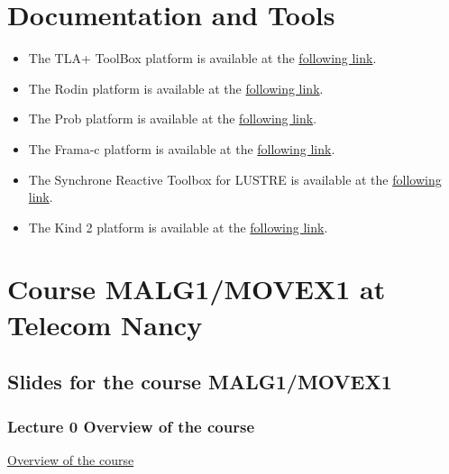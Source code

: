 \documentclass[ 12pt]{article}
\begin{document}
\tableofcontents


\section{Documentation and Tools}

\begin{itemize}

    
\item[]  The  TLA+ ToolBox  platform is available at the 
  \href{https://lamport.azurewebsites.net/tla/toolbox.html}{following 
    link}. 
\item[]  The Rodin platform is available at the 
  \href{https://www.event-b.org/install.html}{following 
    link}.

  
  \item[]  The Prob   platform is available at the 
  \href{https://prob.hhu.de}{following 
    link}. 

  
  \item[]  The Frama-c platform is available at the 
  \href{https://www.frama-c.com}{following 
    link}.

  \item[]  The Synchrone Reactive Toolbox for LUSTRE is   available at the 
  \href{https://www-verimag.imag.fr/Outils-SynchronesNEW.html?lang=en}{following 
    link}.

  \item[]  The Kind 2  platform is available at the 
  \href{ https://kind2-mc.github.io/kind2/}{following 
    link}.

  
\end{itemize}




\section{Course MALG1/MOVEX1 at Telecom Nancy}
\label{sec:course-mcfsi-at}


\subsection{Slides for the course MALG1/MOVEX1}
\label{sec:slides}


\subsubsection{Lecture 0 {Overview of the course }}
  
  \href{http://mery54.github.io/teaching/movex/lecturesnotes/movexlecture0.pdf}{Overview of the course }
\end{document}
